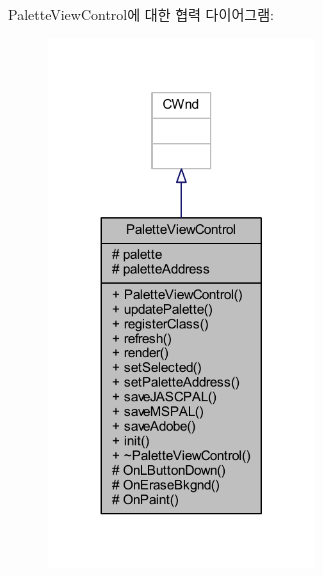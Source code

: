 Palette\+View\+Control에 대한 협력 다이어그램\+:\nopagebreak
\begin{figure}[H]
\begin{center}
\leavevmode
\includegraphics[width=200pt]{class_palette_view_control__coll__graph}
\end{center}
\end{figure}
